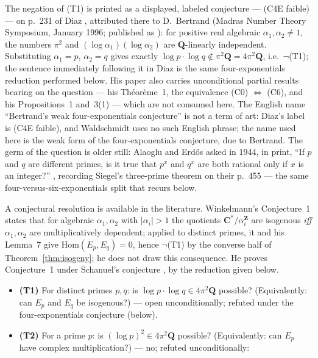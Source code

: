 \documentclass[11pt]{article}
\theoremstyle{definition}
\theoremstyle{remark}
\newcommand{\Z}{\mathbf{Z}}
\newcommand{\Q}{\mathbf{Q}}
\newcommand{\C}{\mathbf{C}}
\newcommand{\Hom}{\mathrm{Hom}}
\begin{document}
The negation of (T1) is printed as a displayed, labeled conjecture ---
(C4E faible) --- on p.~231 of Diaz \cite{Dia97}, attributed there to
D.~Bertrand (Madras Number Theory Symposium, January 1996; published as
\cite[\S5]{Ber97}): for positive real algebraic $\alpha_1, \alpha_2 \neq 1$,
the numbers $\pi^2$ and
$(\log\alpha_1)(\log\alpha_2)$ are $\Q$-linearly independent. Substituting
$\alpha_1 = p$, $\alpha_2 = q$ gives exactly
$\log p \cdot \log q \notin \pi^2\Q = 4\pi^2\Q$, i.e.\ $\neg$(T1); the
sentence immediately following it in Diaz is the same four-exponentials
reduction performed below. His paper also carries unconditional partial
results bearing on the question --- his Th\'eor\`eme~1, the equivalence (C0)
$\Leftrightarrow$ (C6), and his Propositions~1 and~3(1) --- which are not
consumed here. The English name ``Bertrand's weak four-exponentials
conjecture'' is not a term of art: Diaz's label is (C4E faible), and
Waldschmidt uses no such English phrase; the name used here is the weak form
of the four-exponentials conjecture, due to Bertrand. The germ of the question
is older still: Alaoglu and Erd\H{o}s asked in 1944, in print, ``If $p$ and
$q$ are different primes, is it true that $p^x$ and $q^x$ are both rational
only if $x$ is an integer?'' \cite[p.~449]{AE44}, recording Siegel's
three-prime theorem on their p.~455 --- the same
four-versus-six-exponentials split that recurs below.

A conjectural resolution is available in the literature. Winkelmann's
Conjecture~1 \cite[\S3.2, p.~13]{Wi04} states that for algebraic
$\alpha_1, \alpha_2$ with $|\alpha_i| > 1$ the quotients $\C^*/\alpha_i^{\Z}$
are isogenous \emph{iff} $\alpha_1, \alpha_2$ are multiplicatively dependent;
applied to distinct primes, it and his Lemma~7 give $\Hom(E_p, E_q) = 0$,
hence $\neg$(T1) by the converse half of Theorem~\ref{thm:isogeny}; he does
not draw this consequence. He proves Conjecture~1 under Schanuel's conjecture
\cite[\S3.2, Prop.~3, p.~14]{Wi04}, by the reduction given below.

\begin{itemize}
\item \textbf{(T1)} For distinct primes $p, q$: is
$\log p \cdot \log q \in 4\pi^2\Q$ possible? (Equivalently: can $E_p$ and
$E_q$ be isogenous?) --- open unconditionally; refuted under the
four-exponentials conjecture (below).
\item \textbf{(T2)} For a prime $p$: is $(\log p)^2 \in 4\pi^2\Q$ possible?
(Equivalently: can $E_p$ have complex multiplication?) --- no; refuted
unconditionally:
\end{itemize}
\end{document}
